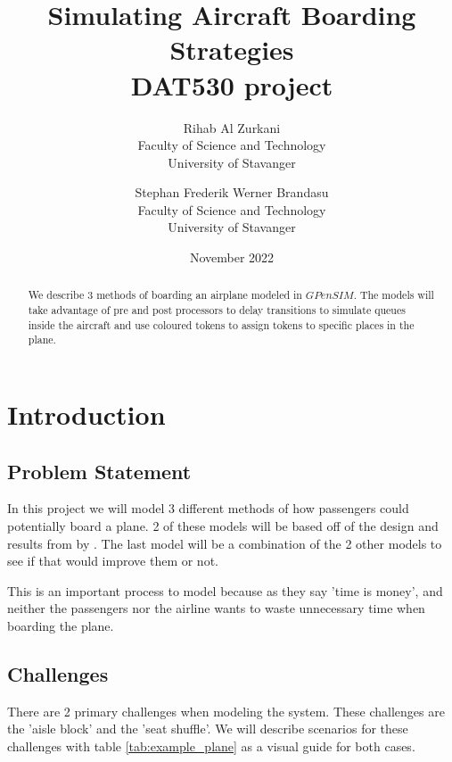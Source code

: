 \documentclass[english]{article}
\title{Simulating Aircraft Boarding Strategies\\
\large DAT530 project}
\author{
Rihab Al Zurkani\\
Faculty of Science and Technology\\
University of Stavanger
\and
Stephan Frederik Werner Brandasu\\
Faculty of Science and Technology\\
University of Stavanger
}
\date{November 2022}
\begin{document}
\maketitle
{}
\newpage

\tableofcontents
\newpage

\begin{abstract}
    We describe 3 methods of boarding an airplane modeled in $GPenSIM$. The models will take advantage of pre and post processors to delay transitions to simulate queues inside the aircraft and use coloured tokens to assign tokens to specific places in the plane.
\end{abstract}
\newpage



\section{Introduction}
\subsection{Problem Statement}
In this project we will model 3 different methods of how passengers could potentially board a plane. 2 of these models will be based off of the design and results from  by \citeauthor{STEFFEN201264}\cite{STEFFEN201264}. The last model will be a combination of the 2 other models to see if that would improve them or not.

This is an important process to model because as they say 'time is money', and neither the passengers nor the airline wants to waste unnecessary time when boarding the plane.


\subsection{Challenges}
There are 2 primary challenges when modeling the system. These challenges are the 'aisle block' and the 'seat shuffle'. We will describe scenarios for these challenges with table \ref{tab:example_plane} as a visual guide for both cases.
\end{document}
